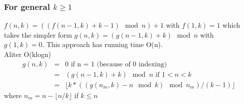 \documentclass[8pt, a4paper, oneside, twocolumn]{extarticle}
\begin{document}
\subsubsection{For general $k \geq 1$}
$f(n, k) =  ((f(n - 1, k) + k - 1) \mod n) + 1$ with $f(1, k) = 1$ which takes the simpler form $g(n, k) = (g(n - 1, k) + k) \mod n$ with $g(1, k) = 0$. This approach has running time O(n).
\\Aliter O(klogn)
\begin{eqnarray}
g(n, k) &=& 0 \text{ if n = 1 (because of 0 indexing)}\\
        &=& (g(n - 1, k) + k) \mod n \text{ if $1 < n < k$}\\
        &=& \lfloor k * ((g(n_m, k) - n \mod k) \mod n_m) / (k - 1) \rfloor 
\end{eqnarray}
where $n_m = n - \lfloor n/k \rfloor$ if $k \leq n$
\end{document}
